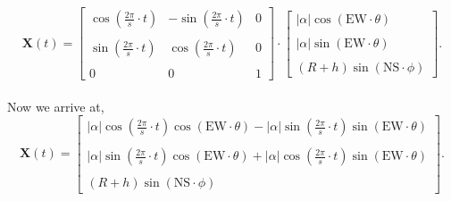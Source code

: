 \documentclass[11pt]{article}
\theoremstyle{definition}
\newcommand{\1}[1]{\mathbf{1} \left \{ #1 \right \}}
\begin{document}
\[\textbf{X}(t) = \begin{bmatrix}
\cos \left(\frac{2\pi}{s} \cdot t\right) & -\sin \left(\frac{2\pi}{s} \cdot t\right) & 0 \\ \\
\sin \left(\frac{2\pi}{s} \cdot t\right) & \cos \left(\frac{2\pi}{s} \cdot t\right) & 0 \\ \\
0 & 0 & 1 \end{bmatrix} \cdot
\begin{bmatrix}
|\alpha| \cos (\textrm{EW} \cdot \theta) \\ \\
|\alpha| \sin (\textrm{EW} \cdot \theta) \\ \\
(R + h) \sin (\textrm{NS} \cdot \phi)
\end{bmatrix}. \] \\
Now we arrive at,
\[\textbf{X}(t) = \begin{bmatrix}
|\alpha| \cos \left(\frac{2\pi}{s} \cdot t \right) \cos (\textrm{EW} \cdot \theta) - |\alpha| \sin \left(\frac{2\pi}{s} \cdot t \right) \sin (\textrm{EW} \cdot \theta) \\ \\
|\alpha| \sin \left(\frac{2\pi}{s} \cdot t \right) \cos (\textrm{EW} \cdot \theta) + |\alpha| \cos \left(\frac{2\pi}{s} \cdot t \right) \sin (\textrm{EW} \cdot \theta) \\ \\
(R + h) \sin (\textrm{NS} \cdot \phi)
\end{bmatrix}.\]
\end{document}
